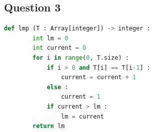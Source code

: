 \documentclass{article}
\begin{document}
\subsection*{Question 3}
\begin{lstlisting}[language=Python, caption={Complétion du modèle de la fonction \textit{IMP}}]
    def lmp (T : Array[integer]) -> integer : 
        int lm = 0
        int current = 0
        for i in range(0, T.size) : 
            if i > 0 and T[i] == T[i-1] : 
                current = current + 1 
            else : 
                current = 1
            if current > lm : 
                lm = current
        return lm 
\end{lstlisting}
\end{document}
